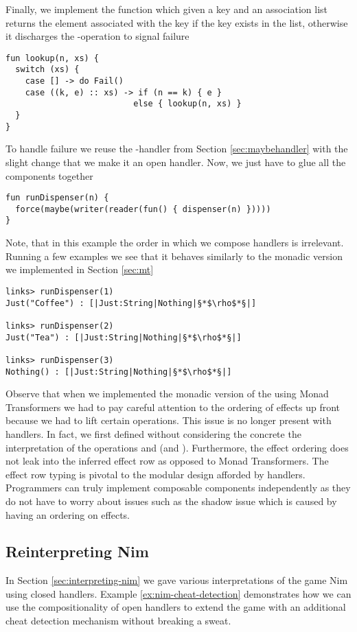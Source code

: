 \begin{example}
Finally, we implement the  function which given a key and an association list returns the element associated with the key if the key exists in the list, otherwise it discharges the -operation to signal failure
\begin{lstlisting}[style=links]
fun lookup(n, xs) {
  switch (xs) {
    case [] -> do Fail()
    case ((k, e) :: xs) -> if (n == k) { e }
                          else { lookup(n, xs) }
  }
}
\end{lstlisting}
To handle failure we reuse the -handler from Section \ref{sec:maybehandler} with the slight change that we make it an open handler. Now, we just have to glue all the components together
\begin{lstlisting}[style=links]
fun runDispenser(n) {
  force(maybe(writer(reader(fun() { dispenser(n) }))))
}
\end{lstlisting}
Note, that in this example the order in which we compose handlers is irrelevant.
Running a few examples we see that it behaves similarly to the monadic version we implemented in Section \ref{sec:mt}
\begin{lstlisting}[style=links]
links> runDispenser(1)
Just("Coffee") : [|Just:String|Nothing|§*$\rho$*§|]

links> runDispenser(2)
Just("Tea") : [|Just:String|Nothing|§*$\rho$*§|]

links> runDispenser(3)
Nothing() : [|Just:String|Nothing|§*$\rho$*§|]
\end{lstlisting}
\end{example}
Observe that when we implemented the monadic version of the  using Monad Transformers we had to pay careful attention to the ordering of effects up front because we had to lift certain operations. This issue is no longer present with handlers. In fact, we first defined  without considering the concrete the interpretation of the operations  and  (and ). Furthermore, the effect ordering does not leak into the inferred effect row as opposed to Monad Transformers. The effect row typing is pivotal to the modular design afforded by handlers. Programmers can truly implement composable components independently as they do not have to worry about issues such as the shadow issue which is caused by having an ordering on effects.

\subsection{Reinterpreting Nim}\label{sec:reinterpreting-nim}
In Section \ref{sec:interpreting-nim} we gave various interpretations of the game Nim using closed handlers. Example \ref{ex:nim-cheat-detection} demonstrates how we can use the compositionality of open handlers to extend the game with an additional cheat detection mechanism without breaking a sweat.

